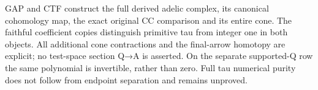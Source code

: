 GAP and CTF construct the full derived adelic complex, its canonical
cohomology map, the exact original CC comparison and its entire cone.
The faithful coefficient copies distinguish primitive tau from integer
one in both objects. All additional cone contractions and the
final-arrow homotopy are explicit; no test-space section Q→A is
asserted. On the separate supported-Q row the same polynomial is
invertible, rather than zero. Full tau numerical purity does not follow
from endpoint separation and remains unproved.
